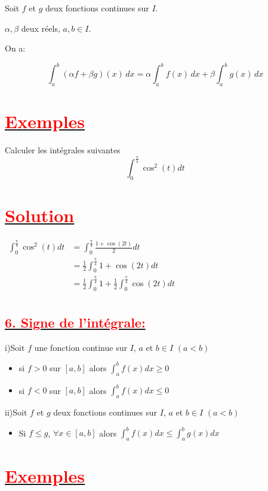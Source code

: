 \documentclass[12pt,a4paper]{article}
\begin{document}
Soit \( f \) et \( g \) deux fonctions continues sur \( I \). 

\( \alpha, \beta \) deux réels,  \( a, b \in I \).

On a:

\[
\boxed{\int_a^b \left( \alpha f + \beta g \right)(x) \, dx = \alpha \int_a^b f(x) \, dx + \beta \int_a^b g(x) \, dx}
\]

\section*{\underline{\textbf{\textcolor{red}{Exemples}}}}
Calculer les intégrales suivantes
\[ \int_0^{\frac{\pi}{4}}\cos^{2}(t)dt\]
\section*{\underline{\textbf{\textcolor{red}{Solution}}}}
\( 
\begin{aligned} 
\int_0^{\frac{\pi}{4}}\cos^{2}(t)dt &=\int_0^{\frac{\pi}{4}}\frac{1+\cos(2t)}{2}dt \\
&=\frac{1}{2}\int_0^{\frac{\pi}{4}}1+\cos(2t)dt \\
&=\frac{1}{2}\int_0^{\frac{\pi}{4}}1+\frac{1}{2}\int_0^{\frac{\pi}{4}}\cos(2t)dt \\
\end{aligned}
\)
\subsection*{\underline{\textbf{\textcolor{red}{6. Signe de l'intégrale:}}}}
i)Soit $f$ une fonction continue sur $I$, $a$ et $b\in I$  $(a<b)$
\begin{itemize}
\item si $f>0$ sur $[a,b]$ alors $\int_a^b f(x)dx \geq 0$
\item si $f<0$ sur $[a,b]$ alors $\int_a^b f(x)dx \leq 0$
\end{itemize}
ii)Soit $f$ et $g$ deux fonctions continues sur $I$, $a$ et $b\in I$  $(a<b)$
\begin{itemize}
\item Si $f \leq g$, $\forall x \in[a,b]$ alors $ \int_a^b f(x)dx \leq \int_a^b g(x)dx$
\end{itemize}
\section*{\underline{\textbf{\textcolor{red}{Exemples}}}}
\end{document}
